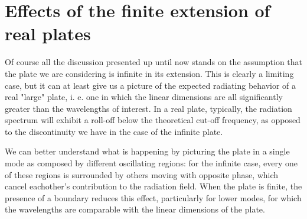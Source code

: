 \documentclass[a4paper]{article}
\begin{document}
\section{Effects of the finite extension of real plates}

Of course all the discussion presented up until now stands on the assumption that the plate we are considering is infinite in its extension. This is clearly a limiting case, but it can at least give us a picture of the expected radiating behavior of a real "large" plate, i. e. one in which the linear dimensions are all significantly greater than the wavelengths of interest. In a real plate, typically, the radiation spectrum will exhibit a roll-off below the theoretical cut-off frequency, as opposed to the discontinuity we have in the case of the infinite plate.

We can better understand what is happening by picturing the plate in a single mode as composed by different oscillating regions: for the infinite case, every one of these regions is surrounded by others moving with opposite phase, which cancel eachother's contribution to the radiation field. When the plate is finite, the presence of a boundary reduces this effect, particularly for lower modes, for which the wavelengths are comparable with the linear dimensions of the plate.

\printbibliography
\end{document}
